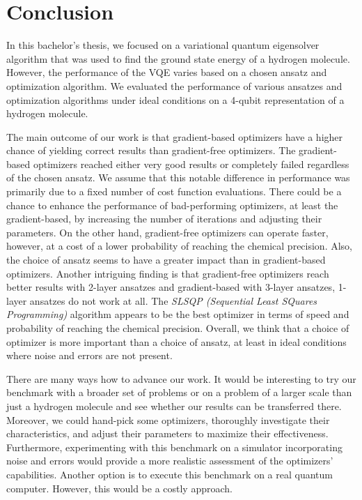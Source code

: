 \chapter*{Conclusion}

In this bachelor's thesis, we focused on a variational quantum eigensolver algorithm that was used to find the ground state energy of a hydrogen molecule. However, the performance of the VQE varies based on a chosen ansatz and optimization algorithm. We evaluated the performance of various ansatzes and optimization algorithms under ideal conditions on a 4-qubit representation of a hydrogen molecule.

The main outcome of our work is that gradient-based optimizers have a higher chance of yielding correct results than gradient-free optimizers. The gradient-based optimizers reached either very good results or completely failed regardless of the chosen ansatz. We assume that this notable difference in performance was primarily due to a fixed number of cost function evaluations. There could be a chance to enhance the performance of bad-performing optimizers, at least the gradient-based, by increasing the number of iterations and adjusting their parameters. On the other hand, gradient-free optimizers can operate faster, however, at a cost of a lower probability of reaching the chemical precision. Also, the choice of ansatz seems to have a greater impact than in gradient-based optimizers. Another intriguing finding is that gradient-free optimizers reach better results with 2-layer ansatzes and gradient-based with 3-layer ansatzes, 1-layer ansatzes do not work at all. The \textit{SLSQP (Sequential Least SQuares Programming)} algorithm appears to be the best optimizer in terms of speed and probability of reaching the chemical precision. Overall, we think that a choice of optimizer is more important than a choice of ansatz, at least in ideal conditions where noise and errors are not present.
    
There are many ways how to advance our work. It would be interesting to try our benchmark with a broader set of problems or on a problem of a larger scale than just a hydrogen molecule and see whether our results can be transferred there. Moreover, we could hand-pick some optimizers, thoroughly investigate their characteristics, and adjust their parameters to maximize their effectiveness. Furthermore, experimenting with this benchmark on a simulator incorporating noise and errors would provide a more realistic assessment of the optimizers' capabilities. Another option is to execute this benchmark on a real quantum computer. However, this would be a costly approach.